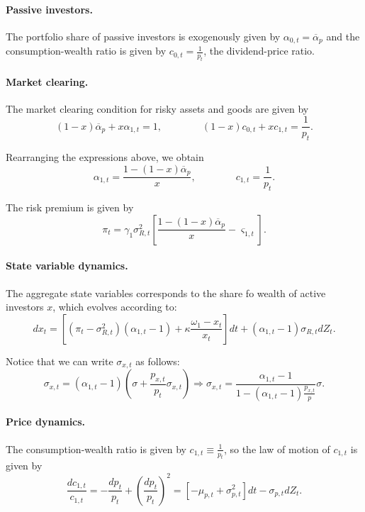 \documentclass[11pt,english]{article}
\begin{document}
\paragraph{Passive investors.} The portfolio share of passive investors is exogenously given by $\alpha_{0,t} = \overline{\alpha}_{p}$ and the consumption-wealth ratio is given by
$c_{0,t} = \frac{1}{p_t}$, the dividend-price ratio. 

\paragraph{Market clearing.} The market clearing condition for risky assets and goods are given by
\begin{equation}
    (1-x) \overline{\alpha}_p +x \alpha_{1,t} = 1, \qquad \qquad 
    (1-x) c_{0,t}+ x c_{1,t} = \frac{1}{p_t}.
\end{equation}

Rearranging the expressions above, we obtain
\begin{equation}
    \alpha_{1,t} = \frac{1 - (1-x) \overline{\alpha}_p}{x}, \qquad \qquad c_{1,t} = \frac{1}{p_t}.
\end{equation}

The risk premium is given by
\begin{equation}
    \pi_t = \gamma_1 \sigma_{R,t}^2 \left[ \frac{1-(1-x) \overline{\alpha}_p}{x} - \varsigma_{1,t} \right].
\end{equation}

\paragraph{State variable dynamics.} The aggregate state variables corresponds to the share fo wealth of active investors $x$, which evolves according to: 
\begin{equation}
d x_t = \left[  (\pi_t-\sigma_{R,t}^2) (\alpha_{1,t}  -1)+ \kappa \frac{\omega_1 - x_t}{x_t} \right]dt +(\alpha_{1,t}-1) \sigma_{R,t} dZ_t.
\end{equation}

Notice that we can write $\sigma_{x,t}$ as follows:
\begin{equation}
    \sigma_{x,t} = (\alpha_{1,t}-1) \left(\sigma+\frac{p_{x,t}}{p_t} \sigma_{x,t}\right) \Rightarrow \sigma_{x,t} = \frac{\alpha_{1,t} -1}{1- (\alpha_{1,t}-1) \frac{p_{x,t}}{p}} \sigma.
\end{equation}

\paragraph{Price dynamics.} The consumption-wealth ratio is given by $c_{1,t} \equiv \frac{1}{p_t}$, so the law of motion of $c_{1,t}$ is given by
\begin{equation}
    \frac{d c_{1,t}}{c_{1,t}} = -\frac{dp_t}{p_t} + \left( \frac{d p_t}{p_t} \right)^2 = \left[ -\mu_{p,t} +\sigma_{p,t}^2 \right] dt - \sigma_{p,t} dZ_t. 
\end{equation}
\end{document}
